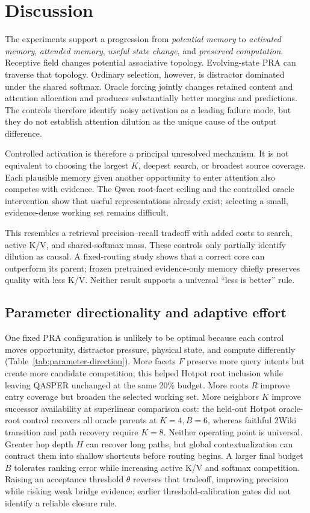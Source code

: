 \section{Discussion}

The experiments support a progression from \emph{potential memory} to \emph{activated memory},
\emph{attended memory}, \emph{useful state change}, and \emph{preserved computation}.  Receptive
field changes potential associative topology.  Evolving-state PRA can traverse that topology.
Ordinary selection, however, is distractor dominated under the shared softmax.  Oracle forcing
jointly changes retained content and attention allocation and produces substantially better margins
and predictions.  The controls therefore identify noisy activation as a leading failure mode, but
they do not establish attention dilution as the unique cause of the output difference.

Controlled activation is therefore a principal unresolved mechanism.  It is not equivalent to
choosing the largest $K$, deepest search, or broadest source coverage.  Each plausible memory given
another opportunity to enter attention also competes with evidence.  The Qwen root-facet ceiling and
the controlled oracle intervention show that useful representations already exist; selecting a
small, evidence-dense working set remains difficult.

This resembles a retrieval precision--recall tradeoff with added costs to search, active K/V, and
shared-softmax mass.  These controls only partially identify dilution as causal.  A fixed-routing
study shows that a correct core can outperform its parent; frozen pretrained evidence-only memory
chiefly preserves quality with less K/V.  Neither result supports a universal ``less is better'' rule.

\subsection{Parameter directionality and adaptive effort}

One fixed PRA configuration is unlikely to be optimal because each control moves opportunity,
distractor pressure, physical state, and compute differently (Table~\ref{tab:parameter-direction}).
More facets $F$ preserve more query intents but create more candidate competition; this helped
Hotpot root inclusion while leaving QASPER unchanged at the same 20\% budget.  More roots $R$ improve
entry coverage but broaden the selected working set.  More neighbors $K$ improve successor
availability at superlinear comparison cost: the held-out Hotpot oracle-root control recovers all
oracle parents at $K=4,B=6$, whereas faithful 2Wiki transition and path recovery require $K=8$.
Neither operating point is universal.  Greater hop depth $H$ can recover long paths, but global
contextualization can contract them into shallow shortcuts before routing begins.  A larger final
budget $B$ tolerates ranking error while increasing active K/V and softmax competition.  Raising an
acceptance threshold $\theta$ reverses that tradeoff, improving precision while risking weak bridge
evidence; earlier threshold-calibration gates did not identify a reliable closure rule.

